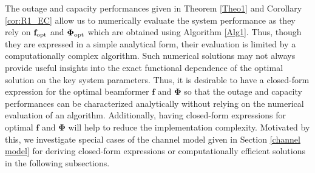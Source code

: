 \documentclass[journal,draftclsnofoot,onecolumn,12pt]{IEEEtran}
\begin{document}


The outage and capacity performances given in Theorem \ref{Theo1} and Corollary \ref{cor:R1_EC} allow us to numerically evaluate the system performance as they rely on $\mathbf{f}_{\rm opt}$ and $\mathbf{\Phi}_{\rm opt}$ which are obtained using Algorithm \ref{Alg1}.  Thus, though they are expressed in a simple analytical form, their evaluation is limited by a computationally complex algorithm. Such numerical solutions may not always provide useful insights into the exact functional dependence of the optimal solution on the key system parameters.
Thus, it is desirable to have a closed-form expression for the optimal beamformer $\mathbf{f}$ and $\mathbf{\Phi}$ so that the outage and capacity performances can be characterized analytically without relying on the numerical evaluation of an algorithm. Additionally, having closed-form expressions for optimal $\mathbf{f}$ and $\mathbf{\Phi}$ will help to reduce the implementation complexity. Motivated by this, we investigate special cases of the channel model given in Section \ref{channel model} for deriving closed-form expressions or computationally efficient solutions  in the following subsections.
\vspace{-.5cm}
\end{document}
